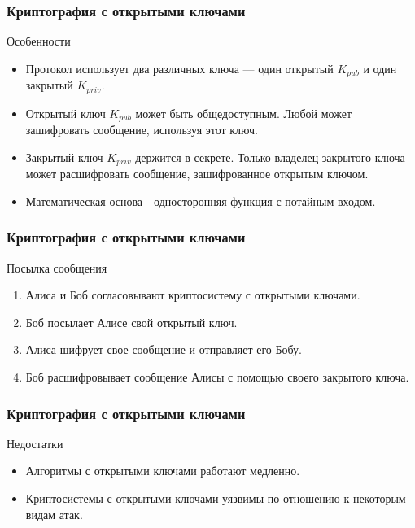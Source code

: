 \documentclass{beamer}
\begin{document}
\begin{frame}
  \frametitle{Криптография с открытыми ключами}
  \begin{block}{Особенности}
    \begin{itemize}
      \item{Протокол использует два различных ключа --- один открытый $K_{pub}$ и один закрытый $K_{priv}$.}
      \item{Открытый ключ $K_{pub}$ может быть общедоступным. Любой может зашифровать сообщение, используя этот ключ.}
      \item{Закрытый ключ $K_{priv}$ держится в секрете. Только владелец закрытого ключа может расшифровать
        сообщение, зашифрованное открытым ключом.}
      \item{Математическая основа - односторонняя функция с потайным входом.}
    \end{itemize}
  \end{block}
\end{frame}


\begin{frame}
  \frametitle{Криптография с открытыми ключами}
  \begin{block}{Посылка сообщения}
    \begin{enumerate}
      \item{Алиса и Боб согласовывают криптосистему с открытыми ключами.}
      \item{Боб посылает Алисе свой открытый ключ.}
      \item{Алиса шифрует свое сообщение и отправляет его Бобу.}
      \item{Боб расшифровывает сообщение Алисы с помощью своего закрытого ключа.}
    \end{enumerate}
  \end{block}
\end{frame}


\begin{frame}
  \frametitle{Криптография с открытыми ключами}
  \begin{block}{Недостатки}
    \begin{itemize}
      \item{Алгоритмы с открытыми ключами работают медленно.}
      \item{Криптосистемы с открытыми ключами уязвимы по отношению к некоторым видам атак.}
    \end{itemize}
  \end{block}
\end{frame}
\end{document}
